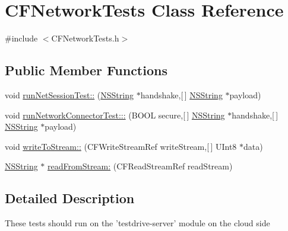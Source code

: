 \hypertarget{interface_c_f_network_tests}{
\section{\-C\-F\-Network\-Tests \-Class \-Reference}
\label{interface_c_f_network_tests}
}


{\ttfamily \#include $<$\-C\-F\-Network\-Tests.\-h$>$}

\subsection*{\-Public \-Member \-Functions}
\begin{DoxyCompactItemize}
\item 
void \hyperlink{interface_c_f_network_tests_a759ce7d77f13115dc3529339d1b1f966}{run\-Net\-Session\-Test\-::} (\hyperlink{class_n_s_string}{\-N\-S\-String} $\ast$handshake,\mbox{[}$\,$\mbox{]} \hyperlink{class_n_s_string}{\-N\-S\-String} $\ast$payload)
\item 
void \hyperlink{interface_c_f_network_tests_af43c1692b1223ca97714904594e9add2}{run\-Network\-Connector\-Test\-:::} (\-B\-O\-O\-L secure,\mbox{[}$\,$\mbox{]} \hyperlink{class_n_s_string}{\-N\-S\-String} $\ast$handshake,\mbox{[}$\,$\mbox{]} \hyperlink{class_n_s_string}{\-N\-S\-String} $\ast$payload)
\item 
void \hyperlink{interface_c_f_network_tests_a9fefcb0d9484f0b4969512758b1c2728}{write\-To\-Stream\-::} (\-C\-F\-Write\-Stream\-Ref write\-Stream,\mbox{[}$\,$\mbox{]} \-U\-Int8 $\ast$data)
\item 
\hyperlink{class_n_s_string}{\-N\-S\-String} $\ast$ \hyperlink{interface_c_f_network_tests_a30dca2e6bea4cbb9ebe4035c010d83e3}{read\-From\-Stream\-:} (\-C\-F\-Read\-Stream\-Ref read\-Stream)
\end{DoxyCompactItemize}


\subsection{\-Detailed \-Description}
\-These tests should run on the 'testdrive-\/server' module on the cloud side 

